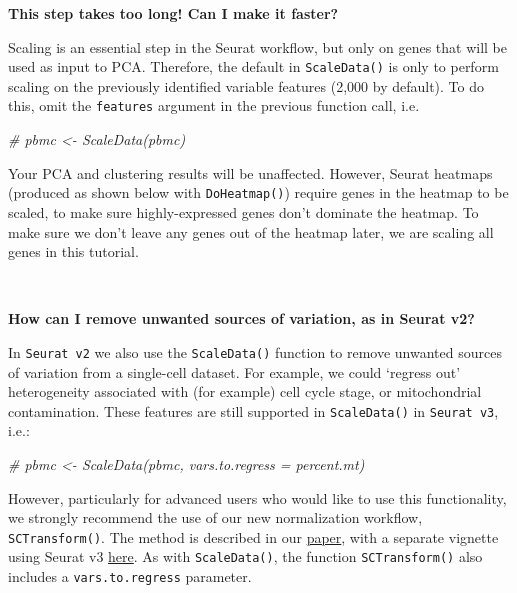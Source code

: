 \documentclass[
]{book}
\newenvironment{Shaded}{\begin{snugshade}}{\end{snugshade}}
\newcommand{\CommentTok}[1]{\textcolor[rgb]{0.56,0.35,0.01}{\textit{#1}}}
\begin{document}
\textbf{This step takes too long! Can I make it faster?}

Scaling is an essential step in the Seurat workflow, but only on genes that will be used as input to PCA. Therefore, the default in \texttt{ScaleData()} is only to perform scaling on the previously identified variable features (2,000 by default). To do this, omit the \texttt{features} argument in the previous function call, i.e.

\begin{Shaded}
\begin{Highlighting}[]
\CommentTok{\# pbmc \textless{}{-} ScaleData(pbmc)}
\end{Highlighting}
\end{Shaded}

Your PCA and clustering results will be unaffected. However, Seurat heatmaps (produced as shown below with \texttt{DoHeatmap()}) require genes in the heatmap to be scaled, to make sure highly-expressed genes don't dominate the heatmap. To make sure we don't leave any genes out of the heatmap later, we are scaling all genes in this tutorial.

~

\textbf{How can I remove unwanted sources of variation, as in Seurat v2?}

In \texttt{Seurat\ v2} we also use the \texttt{ScaleData()} function to remove unwanted sources of variation from a single-cell dataset. For example, we could `regress out' heterogeneity associated with (for example) cell cycle stage, or mitochondrial contamination. These features are still supported in \texttt{ScaleData()} in \texttt{Seurat\ v3}, i.e.:

\begin{Shaded}
\begin{Highlighting}[]
\CommentTok{\# pbmc \textless{}{-} ScaleData(pbmc, vars.to.regress = \textquotesingle{}percent.mt\textquotesingle{})}
\end{Highlighting}
\end{Shaded}

However, particularly for advanced users who would like to use this functionality, we strongly recommend the use of our new normalization workflow, \texttt{SCTransform()}. The method is described in our \href{https://genomebiology.biomedcentral.com/articles/10.1186/s13059-019-1874-1}{paper}, with a separate vignette using Seurat v3 \href{sctransform_vignette.html}{here}. As with \texttt{ScaleData()}, the function \texttt{SCTransform()} also includes a \texttt{vars.to.regress} parameter.
\end{document}
